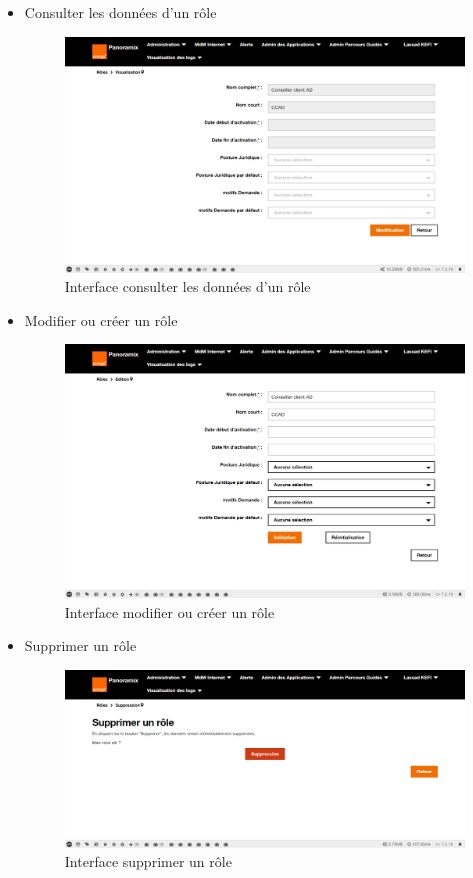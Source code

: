 \begin{itemize}
	\item Consulter les données d'un rôle
	\begin{figure}[H]
		\centering
		\includegraphics[width=0.6\linewidth]{img/screenshots/roles/view}
		\caption[Interface voir un rôle]{Interface consulter les données d'un rôle}
		\label{fig:view-role}
	\end{figure}
	\newpage
	\item Modifier ou créer un rôle
	\begin{figure}[H]
		\centering
		\includegraphics[width=0.7\linewidth]{img/screenshots/roles/edit}
		\caption[Interface modifier ou créer un rôle]{Interface modifier ou créer un rôle}
		\label{fig:modif-role}
	\end{figure}

	\item Supprimer un rôle
	\begin{figure}[H]
		\centering
		\includegraphics[width=0.7\linewidth]{img/screenshots/roles/delete}
		\caption[Interface Supprimer un rôle]{Interface supprimer un rôle}
		\label{fig:delete-role}
	\end{figure}
\end{itemize}

